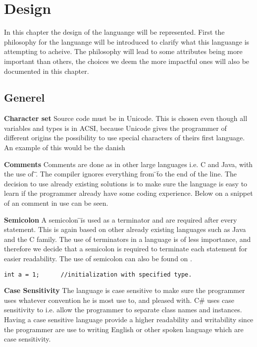 \chapter{Design}
\label{cha:Design}
In this chapter the design of the languange will be represented.
First the philosophy for the languange will be introduced to clarify what this languange is attempting to acheive.
The philosophy will lead to some attributes being more important than others, the choices we deem the more impactful ones will also be documented in this chapter.



\section{Generel}
\textbf{Character set}
Source code must be in Unicode.
This is chosen even though all variables and types is in ACSI, because Unicode gives the programmer of different origins the possibility to use special characters of theirs first language.
An example of this would be the danish %

\textbf{Comments}
Comments are done as in other large languages i.e. C and Java, with the use of \"\/\/\".
The compiler ignores everything from \"\/\/\" to the end of the line.
The decision  to use already existing solutions is to make sure the language is easy to learn if the programmer already have some coding experience.
Below on  a snippet of an comment in use can be seen.

\textbf{Semicolon}
A semicolon \"\;\" is used as a terminator and are required after every statement.
This is again based on other already existing languages such as Java and the C family.
The use of terminators in a language is of less importance, and therefore we decide that a semicolon is required to terminate each statement for easier readability.
The use of semicolon can also be found on .


\begin{lstlisting}[caption={Comment and Semicolon},label={lst:CommSemi}]
int a = 1;		//initialization with specified type.
\end{lstlisting}

\textbf{Case Sensitivity}
The language is case sensitive to make sure the programmer uses whatever convention he is most use to, and pleased with.
C\# uses case sensitivity to i.e. allow the programmer to separate class names and instances.
Having a case sensitive language provide a higher readability and writability since the programmer are use to writing English or other spoken language which are case sensitivity.

